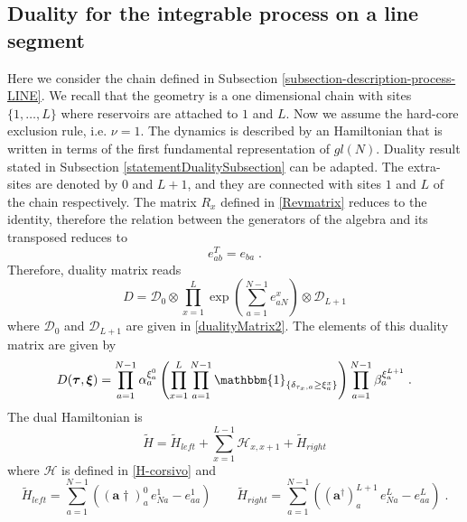 \documentclass[10pt]{article}
\numberwithin{equation}{section}
\numberwithin{equation}{subsection}
\newcommand{\dt}{\;.}
\begin{document}
\subsection{Duality for the integrable process on a line segment}\label{integrableChain-duality}
Here we consider the chain defined in Subsection \ref{subsection-description-process-LINE}. We recall that the geometry is a one dimensional chain with sites $\{1,\ldots,L\}$ where reservoirs are attached to $1$ and $L$. Now we assume the hard-core exclusion rule, i.e. $\nu=1$. The dynamics is described by an Hamiltonian that is written in terms of the first fundamental representation of $gl(N)$. Duality result stated in Subsection \ref{statementDualitySubsection} can be adapted. The extra-sites are denoted by $0$ and $L+1$, and they are connected with sites $1$ and $L$ of the chain respectively. The matrix $R_{x}$ defined in \eqref{Revmatrix} 
reduces to the identity, therefore the relation between the generators of the algebra and its transposed reduces to
\begin{equation}\label{transpostionPropertyFund}
	e_{ab}^T= e_{ba}\dt
\end{equation}
Therefore, duality matrix reads
\begin{equation}
	D=\mathcal{D}_{0}\otimes\prod_{x=1}^{L}\exp{\left(\sum_{a=1}^{N-1}e_{aN}^{x}\right)}\otimes \mathcal{D}_{L+1}
\end{equation}
where $\mathcal{D}_{0}$ and $\mathcal{D}_{L+1}$ are given in \eqref{dualityMatrix2}. 
The elements of this duality matrix are given by
\begin{equation}\label{ElementsDualityMatrixChain_1}
	D(\bm{\tau},\bm{\xi})=\prod_{a=1}^{N-1}\alpha_{a}^{\xi_{a}^{0}}\left(\prod_{x=1}^{L}\prod_{a=1}^{N-1}\mathbbm{1}_{\{\delta_{\tau_{x},a}\geq \xi_{a}^{x}\}}\right)\prod_{a=1}^{N-1}\beta_{a}^{\xi_{a}^{L+1}}\dt
\end{equation}
The dual Hamiltonian is
\begin{equation}
	\widetilde{H}=\widetilde{H}_{left}+\sum_{x=1}^{L-1}\mathcal{H}_{x,x+1}+\widetilde{H}_{right}
\end{equation}
where $\mathcal{H}$ is defined in \eqref{H-corsivo} and 
\begin{equation}\label{boundary-H-dual-chain}
	\widetilde{H}_{left}=\sum_{a=1}^{N-1}\left((\mathbf{a}{\dagger})_{a}^{0}\,e_{Na}^{1}-e_{aa}^{1}\right)\qquad 	\widetilde{H}_{right}=\sum_{a=1}^{N-1}\left((\mathbf{a}^{\dagger})_{a}^{L+1}\,e_{Na}^{L}-e_{aa}^{L}\right)\dt
\end{equation}
\end{document}
